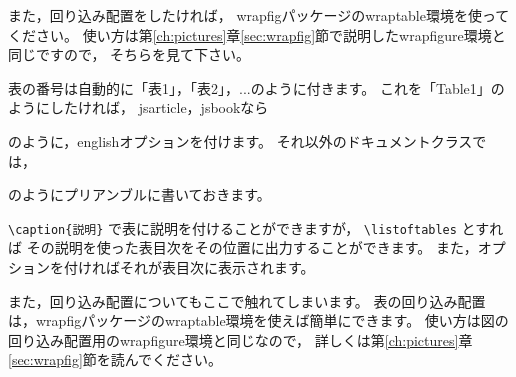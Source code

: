\documentclass[class=jreport, crop=false, preview=false, dvipdfmx, fleqn]{standalone}
\begin{document}
また，回り込み配置をしたければ，
wrapfigパッケージのwraptable環境を使ってください。
使い方は第\ref{ch:pictures}章\ref{sec:wrapfig}節で説明したwrapfigure環境と同じですので，
そちらを見て下さい。

表の番号は自動的に「表1」，「表2」，...のように付きます。
これを「Table1」のようにしたければ，
jsarticle，jsbookなら
のように，englishオプションを付けます。
それ以外のドキュメントクラスでは，
\begin{ITeX}
\renewcommand{\tablename}{Table}
\end{ITeX}
のようにプリアンブルに書いておきます。

\verb|\caption{説明}| で表に説明を付けることができますが，
\verb|\listoftables| とすれば
その説明を使った表目次をその位置に出力することができます。
また，オプションを付ければそれが表目次に表示されます。

また，回り込み配置についてもここで触れてしまいます。
表の回り込み配置は，wrapfigパッケージのwraptable環境を使えば簡単にできます。
使い方は図の回り込み配置用のwrapfigure環境と同じなので，
詳しくは第\ref{ch:pictures}章\ref{sec:wrapfig}節を読んでください。
\end{document}
